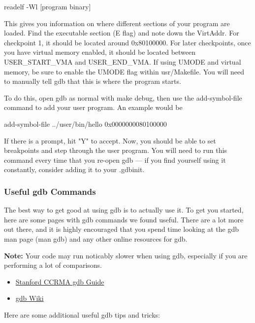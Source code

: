 \documentclass{article}
\begin{document}
	{\fix readelf -Wl [program binary]}

	This gives you information on where different sections of your program are loaded.
	Find the executable section ({\fix E} flag) and note down the {\fix VirtAddr}.
	For checkpoint 1, it should be located around {\fix 0x80100000}. For later checkpoints, 
	once you have virtual memory enabled, it should be located between {\fix USER\_START\_VMA} 
	and {\fix USER\_END\_VMA}. If using {\fix UMODE} and virtual memory, be sure to enable the {\fix UMODE}
	flag within {\fix usr/Makefile}.
	You will need to manually tell gdb that this is where the program starts.

	To do this, open gdb as normal with {\fix make debug}, then use the {\fix add-symbol-file}
	command to add your user program. An example would be

	{\fix add-symbol-file ../user/bin/hello 0x0000000080100000}

	If there is a prompt, hit "Y" to accept. Now, you should be able to set breakpoints
	and step through the user program. You will need to run this command every time that
	you re-open gdb --- if you find yourself using it constantly, consider adding it to
	your {\fix .gdbinit}.

	\subsubsection{Useful gdb Commands}

	The best way to get good at using gdb is to actually use it. To get you started, here are some
	pages with gdb commands we found useful. There are a lot more out there, and it is highly encouraged
	that you spend time looking at the gdb man page ({\fix man gdb}) and any other online resources for gdb.

	\textbf{Note:} Your code may run noticably slower when using gdb, especially if you are performing a lot of comparisons.

	\begin{itemize}
		\item \href{https://ccrma.stanford.edu/~jos/stkintro/Useful_commands_gdb.html}{Stanford CCRMA gdb Guide}
		\item \href{https://sourceware.org/gdb/current/onlinedocs/gdb.html/index.html}{gdb Wiki}
	\end{itemize} %

	Here are some additional useful gdb tips and tricks:
\end{document}
